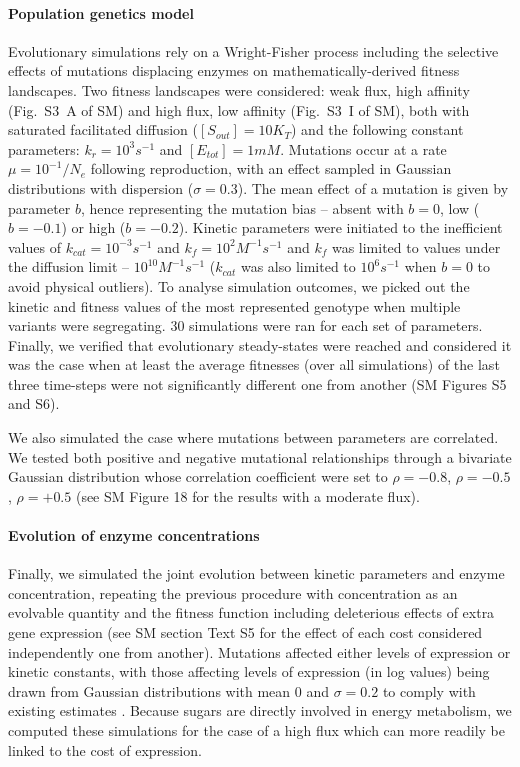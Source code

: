 \noindent \paragraph{Population genetics model}

Evolutionary simulations rely on a Wright-Fisher process including the selective effects of mutations displacing enzymes on mathematically-derived fitness landscapes. Two fitness landscapes were considered: weak flux, high affinity (Fig.~S3~A of SM) and high flux, low affinity (Fig.~S3~I of SM), both with saturated facilitated diffusion ($[S_{out}]=10K_T$) and the following constant parameters: $k_r=10^3s^{-1}$ and $[E_{tot}]=1mM$. Mutations occur at a rate $\mu=10^{-1}/N_e$ following reproduction, with an effect sampled in Gaussian distributions with dispersion ($\sigma=0.3$). The mean effect of a mutation is given by parameter $b$, hence representing the mutation bias -- absent with $b=0$, low ($b=-0.1$) or high ($b=-0.2$). Kinetic parameters were initiated to the inefficient values of $k_{cat}=10^{-3}s^{-1}$ and $k_f=10^2M^{-1}s^{-1}$ and $k_f$ was limited to values under the diffusion limit -- $10^{10}M^{-1}s^{-1}$ ($k_{cat}$ was also limited to $10^{6}s^{-1}$ when $b=0$ to avoid physical outliers). To analyse simulation outcomes, we picked out the kinetic and fitness values of the most represented genotype when multiple variants were segregating. 30 simulations were ran for each set of parameters. Finally, we verified that evolutionary steady-states were reached and considered it was the case when at least the average fitnesses (over all simulations) of the last three time-steps were not significantly different one from another (SM Figures S5 and S6).

We also simulated the case where mutations between parameters are correlated. We tested both positive and negative mutational relationships through a bivariate Gaussian distribution whose correlation coefficient were set to $\rho=-0.8$, $\rho=-0.5$, $\rho=+0.5$ (see SM Figure 18 for the results with a moderate flux). 

\paragraph{Evolution of enzyme concentrations}

Finally, we simulated the joint evolution between kinetic parameters and enzyme concentration, repeating the previous procedure with concentration as an evolvable quantity and the fitness function including deleterious effects of extra gene expression (see SM section Text S5 for the effect of each cost considered independently one from another). Mutations affected either levels of expression or kinetic constants, with those affecting levels of expression (in log values) being drawn from Gaussian distributions with mean $0$ and $\sigma=0.2$ to comply with existing estimates \citep{Landry07,Metzger16,Hodgins-Davis19}. Because sugars are directly involved in energy metabolism, we computed these simulations for the case of a high flux which can more readily be linked to the cost of expression.

